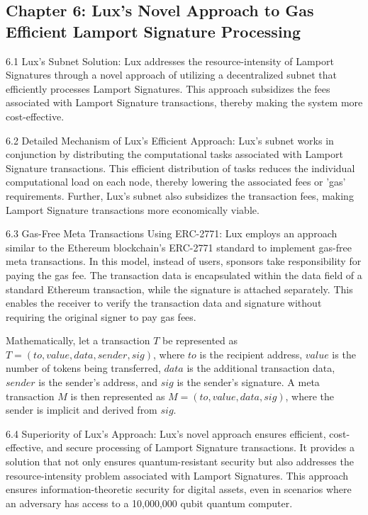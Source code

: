 \documentclass[11pt]{article}
\begin{document}
\subsection{Chapter 6: Lux's Novel Approach to Gas Efficient Lamport Signature Processing}

6.1 Lux's Subnet Solution: Lux addresses the resource-intensity of Lamport Signatures through a novel approach of utilizing a decentralized subnet that efficiently processes Lamport Signatures. This approach subsidizes the fees associated with Lamport Signature transactions, thereby making the system more cost-effective.


6.2 Detailed Mechanism of Lux's Efficient Approach: Lux's subnet works in conjunction by distributing the computational tasks associated with Lamport Signature transactions. This efficient distribution of tasks reduces the individual computational load on each node, thereby lowering the associated fees or 'gas' requirements. Further, Lux's subnet also subsidizes the transaction fees, making Lamport Signature transactions more economically viable.


6.3 Gas-Free Meta Transactions Using ERC-2771: Lux employs an approach similar to the Ethereum blockchain's ERC-2771 standard to implement gas-free meta transactions. In this model, instead of users, sponsors take responsibility for paying the gas fee. The transaction data is encapsulated within the data field of a standard Ethereum transaction, while the signature is attached separately. This enables the receiver to verify the transaction data and signature without requiring the original signer to pay gas fees.


Mathematically, let a transaction \(T\) be represented as \(T = (to, value, data, sender, sig)\), where \(to\) is the recipient address, \(value\) is the number of tokens being transferred, \(data\) is the additional transaction data, \(sender\) is the sender's address, and \(sig\) is the sender's signature. A meta transaction \(M\) is then represented as \(M = (to, value, data, sig)\), where the sender is implicit and derived from \(sig\).


6.4 Superiority of Lux's Approach: Lux's novel approach ensures efficient, cost-effective, and secure processing of Lamport Signature transactions. It provides a solution that not only ensures quantum-resistant security but also addresses the resource-intensity problem associated with Lamport Signatures. This approach ensures information-theoretic security for digital assets, even in scenarios where an adversary has access to a 10,000,000 qubit quantum computer.
\end{document}

